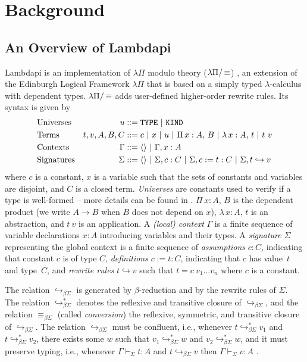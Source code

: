 \section{Background}
\label{sec:background}

\subsection{An Overview of Lambdapi}
\label{ssect:lambdapi-overview}

Lambdapi is an implementation of $\lambda\Pi$ modulo theory ($\lpm$) \cite{lambdapi}, an extension of the Edinburgh Logical Framework $\lambda\Pi$ \cite{lf} that is based on a simply typed $\lambda$-calculus with dependent types. $\lpm$ adds user-defined higher-order rewrite rules. Its syntax is given by
%
\begin{align*}
&\text{Universes}  &u &::= \tt{TYPE} ~|~ \tt{KIND} \\
&\text{Terms}   &t,v, A,B,C &::= c ~|~ x ~|~ u ~|~ \Pi\,x : A,\,B~|~ \lambda\,x : A,\,t ~|~t~v \\
&\text{Contexts}   &\Gamma &::= \langle \rangle ~|~ \Gamma, x : A \\
&\text{Signatures}  &\Sigma &::= \langle \rangle ~|~ \Sigma, c : C ~|~ \Sigma, c := t : C ~|~ \Sigma, t \hookrightarrow v 
\end{align*}
%
where $c$ is a constant, $x$ is a variable such that the sets of constants and variables are disjoint, and $C$ is a closed term. \emph{Universes} are constants used to verify if a type is well-formed -- more details can be found in \cite[\S 2.1]{lf}. $\Pi\,x : A,\,B$ is the dependent product (we write $A \rightarrow B$ when $B$ does not depend on $x$), $\lambda\,x : A,\,t$ is an abstraction, and  $t~v$ is an application. A \emph{(local) context} $\Gamma$ is a finite sequence of variable declarations $x:A$ introducing variables and their types.
A \emph{signature} $\Sigma$ representing the global context is a finite sequence of \emph{assumptions} $c : C$, indicating that constant $c$ is of type $C$, \emph{definitions} $c := t : C$, indicating that $c$ has value~$t$ and type~$C$, and \emph{rewrite rules} $t \hookrightarrow v$ such that $t = c~v_1 \dots v_n$ where $c$ is a constant.

The relation $\hookrightarrow_{\beta\Sigma}$ is generated by $\beta$-reduction and by the rewrite rules of $\Sigma$. The relation $\hookrightarrow_{\beta\Sigma}^*$ denotes the reflexive and transitive closure of $\hookrightarrow_{\beta\Sigma}$, and the relation $\equiv_{\beta\Sigma}$ (called \emph{conversion}) the reflexive, symmetric, and transitive closure of $\hookrightarrow_{\beta\Sigma}$. 
The relation $\hookrightarrow_{\beta\Sigma}$ must be confluent, i.e.,
whenever $t \hookrightarrow_{\beta\Sigma}^* v_1$ and $t \hookrightarrow_{\beta\Sigma}^* v_2$, there exists some $w$ such that $v_1 \hookrightarrow_{\beta\Sigma}^* w$ and $v_2 \hookrightarrow_{\beta\Sigma}^* w$, and it must preserve typing, i.e., 
whenever $\Gamma \vdash_\Sigma t: A$ and $t \hookrightarrow_{\beta\Sigma} v$ then $\Gamma \vdash_\Sigma v: A$ \cite{blanqui:LIPIcs.FSCD.2020.13}.

